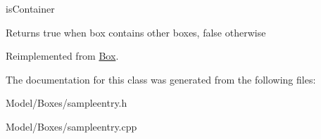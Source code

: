 is\-Container 

\begin{DoxyReturn}{Returns}
true when box contains other boxes, false otherwise 
\end{DoxyReturn}


Reimplemented from \hyperlink{class_box_aa836717b34b2a26f84b6933d143da42b}{Box}.



The documentation for this class was generated from the following files\-:\begin{DoxyCompactItemize}
\item 
Model/\-Boxes/sampleentry.\-h\item 
Model/\-Boxes/sampleentry.\-cpp\end{DoxyCompactItemize}
